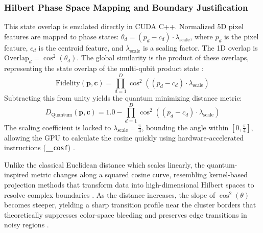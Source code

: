 \subsubsection{Hilbert Phase Space Mapping and Boundary Justification}\label{subsect:phasespace}\label{subsect:boundary_justification}
This state overlap is emulated directly in CUDA C++. Normalized 5D pixel features are mapped to phase states: $\theta_d = (p_d - c_d) \cdot \lambda_{\text{scale}}$, where $p_d$ is the pixel feature, $c_d$ is the centroid feature, and $\lambda_{\text{scale}}$ is a scaling factor. The 1D overlap is $\text{Overlap}_d = \cos^2(\theta_d)$. The global similarity is the product of these overlaps, representing the state overlap of the multi-qubit product state \cite{buhrman2001quantum}:
\begin{equation}
\text{Fidelity}(\mathbf{p}, \mathbf{c}) = \prod_{d=1}^{D} \cos^2\left( (p_d - c_d) \cdot \lambda_{\text{scale}} \right)
\end{equation}
Subtracting this from unity yields the quantum minimizing distance metric:
\begin{equation}
D_{\text{Quantum}}(\mathbf{p},\mathbf{c}) = 1.0 - \prod_{d=1}^{D} \cos^2\left( (p_d - c_d) \cdot \lambda_{\text{scale}} \right)
\end{equation}
The scaling coefficient is locked to $\lambda_{\text{scale}} = \frac{\pi}{4}$, bounding the angle within $[0, \frac{\pi}{4}]$, allowing the GPU to calculate the cosine quickly using hardware-accelerated instructions (\texttt{\_\_cosf}) \cite{CudaGuide}.

Unlike the classical Euclidean distance which scales linearly, the quantum-inspired metric changes along a squared cosine curve, resembling kernel-based projection methods that transform data into high-dimensional Hilbert spaces to resolve complex boundaries \cite{scholkopf1998nonlinear}. As the distance increases, the slope of $\cos^2(\theta)$ becomes steeper, yielding a sharp transition profile near the cluster borders that theoretically suppresses color-space bleeding and preserves edge transitions in noisy regions \cite{shi2000normalized}.
